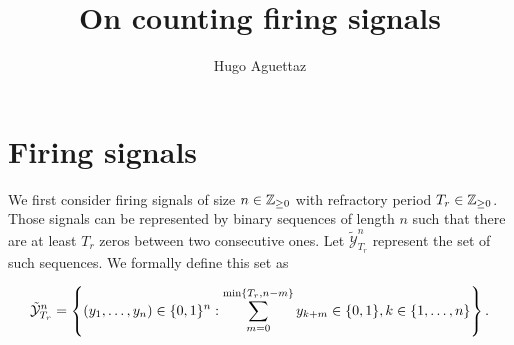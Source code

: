\documentclass{article}
\title{On counting firing signals}
\author{Hugo Aguettaz}
\begin{document}
    \maketitle

    
    
    \section{Firing signals} \label{sec:aperiodic}

    We first consider firing signals of size $n \in \mathbb{Z}_{\geq 0}$ with refractory period $T_r \in \mathbb{Z}_{\geq 0}$. Those signals can be represented by binary 
    sequences of length $n$ such that there are at least $T_r$ zeros between two consecutive ones. Let $\tilde{\mathcal{Y}}_{T_r}^n$
    represent the set of such sequences. We formally define this set as
    
    \begin{equation}
        \tilde{\mathcal{Y}}_{T_r}^n = \left\{ (y_1, \dots, y_n) \in \{0, 1\}^n :
       \sum_{m=0}^{\min\{T_r, n - m\}} y_{k+m} \in \{0, 1\}, k \in \{1, \dots, n\} \right\}.
    \end{equation}
    
\end{document}
